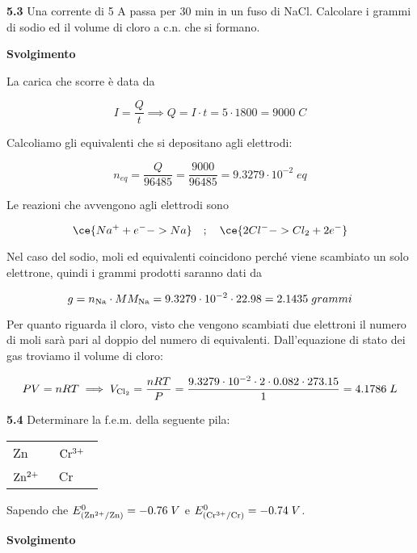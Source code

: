 \vspace{0.2cm}\textbf{5.3} Una corrente di 5 A passa per 30 min in un fuso di NaCl. Calcolare i grammi di sodio ed il
volume di cloro a c.n. che si formano.

\vspace{0.2cm}\large\textbf{Svolgimento}\normalsize

\vspace{0.2cm}La carica che scorre è data da

$$I=\frac{Q}{t}
\implies
Q=I \cdot t
=5 \cdot 1800=9000\;C$$

Calcoliamo gli equivalenti che si depositano agli elettrodi:

$$n_{eq}=\frac{Q}{96485}=\frac{9000}{96485}=9.3279 \cdot 10^{-2}\;eq$$

Le reazioni che avvengono agli elettrodi sono

$$\ce{Na^+ + e^- -> Na}
\quad;\quad
\ce{2Cl^- -> Cl_2 + 2e^-}$$

Nel caso del sodio, moli ed equivalenti coincidono perché viene scambiato un solo elettrone, quindi i grammi prodotti saranno dati da

$$g=n_{\rm Na} \cdot MM_{\rm Na}
=9.3279 \cdot 10^{-2} \cdot 22.98=2.1435\;grammi$$

Per quanto riguarda il cloro, visto che vengono scambiati due elettroni il numero di moli sarà pari al doppio del numero di equivalenti. Dall'equazione di stato dei gas troviamo il volume di cloro:

$$PV=nRT
\implies
V_{\rm Cl_2}=\frac{nRT}{P}
=\frac{9.3279 \cdot 10^{-2} \cdot 2 \cdot 0.082 \cdot 273.15}{1}=4.1786\;L$$

\vspace{0.2cm}\textbf{5.4} Determinare la f.e.m. della seguente pila:

\begin{center}
    \begin{tabular}{|p{3.7cm}||p{3.7cm}|}
         Zn & $\rm Cr^{3+}$ \, \\[0.5ex]
         $\rm Zn^{2+}$ \,  & Cr\\[0.5ex]
    \end{tabular}
\end{center}

Sapendo che $E^{0}_{(\rm Zn^{2+}/Zn)}=-0.76\;V$ e $E^{0}_{(\rm Cr^{3+}/Cr)}=-0.74\;V$.

\vspace{0.2cm}\large\textbf{Svolgimento}\normalsize

